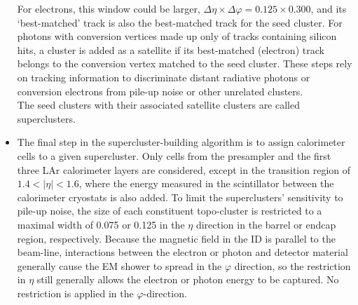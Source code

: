 \documentclass[a4paper, oneside]{book}
\begin{document}
\begin{itemize}
		For electrons, this window could be larger, $\Delta\eta \times \Delta\varphi = 0.125 \times 0.300$, and its ‘best-matched’ track is also the best-matched track for the seed cluster. For photons with conversion vertices made up only of tracks containing silicon hits, a cluster is added as a satellite if its best-matched (electron) track belongs to the conversion vertex matched to the seed cluster. These steps rely on tracking information to discriminate distant radiative photons or conversion electrons from pile-up noise or other unrelated clusters. \\
		The seed clusters with their associated satellite clusters are called superclusters.
		
		\item The final step in the supercluster-building algorithm is to assign calorimeter cells to a given supercluster. Only cells from the presampler and the first three LAr calorimeter layers are considered, except in the transition region of $1.4 < |\eta| < 1.6$, where the energy measured in the scintillator between the calorimeter cryostats is also added. To limit the superclusters’ sensitivity to pile-up noise, the size of each constituent topo-cluster is restricted to a maximal width of 0.075 or 0.125 in the $\eta$ direction in the barrel or endcap region, respectively. Because the magnetic field in the ID is parallel to the beam-line, interactions between the electron or photon and detector material generally cause the EM shower to spread in the $\varphi$ direction, so the restriction in $\eta$ still generally allows the electron or photon energy to be captured. No restriction is applied in the $\varphi$-direction.	
		\end{itemize}
\end{document}
